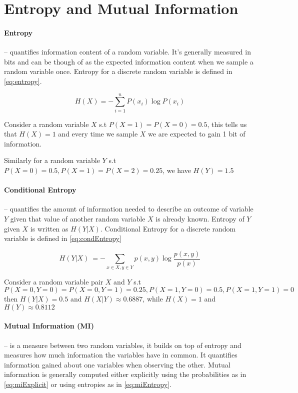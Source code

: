 \section{Entropy and Mutual Information}

\paragraph{Entropy}-- quantifies information content of a random variable. It's
generally measured in bits and can be though of as the expected information
content when we sample a random variable once. Entropy for a discrete random
variable is defined in \autoref{eq:entropy}.

\begin{equation}
  H(X)=-\sum _{i=1}^{n}{P (x_{i})\log P(x_{i})}
\label{eq:entropy}
\end{equation}

Consider a random variable $X$ s.t $P(X=1) = P(X=0) = 0.5$, this tells
us that $H(X) = 1$ and every time we sample $X$ we are expected to gain 1 bit of
information.

Similarly for a random variable $Y$ s.t $P(X=0) = 0.5, P(X=1) = P(X=2) = 0.25$,
we have $H(Y) = 1.5$

\paragraph{Conditional Entropy}-- quantifies the amount of information needed to
describe an outcome of variable $Y$ given that value of another random variable
$X$ is already known. Entropy of $Y$ given $X$ is written as $H(Y|X)$.
Conditional Entropy for a discrete random variable is defined in
\autoref{eq:condEntropy}

\begin{equation}
H(Y|X)\ =-\sum _{x\in {X},y\in {Y}}p(x,y)\log {\frac {p(x,y)}{p(x)}}
\label{eq:condEntropy}
\end{equation}

Consider a random variable pair $X$ and $Y$ s.t 
$$P(X=0,Y=0) = P(X=0,Y=1) = 0.25, P(X=1,Y=0) = 0.5, P(X=1,Y=1) = 0$$
then $H(Y|X) = 0.5$ and $H(X|Y) \approx 0.6887$, while $H(X) = 1$ and $H(Y)
\approx 0.8112$

\paragraph{Mutual Information (MI)}-- is a measure between two random variables,
it builds on top of entropy and measures how much information the variables have
in common. It quantifies information gained about one variables when observing
the other. Mutual information is generally computed either explicitly using the
probabilities as in \autoref{eq:miExplicit} or using entropies as in
\autoref{eq:miEntropy}.

